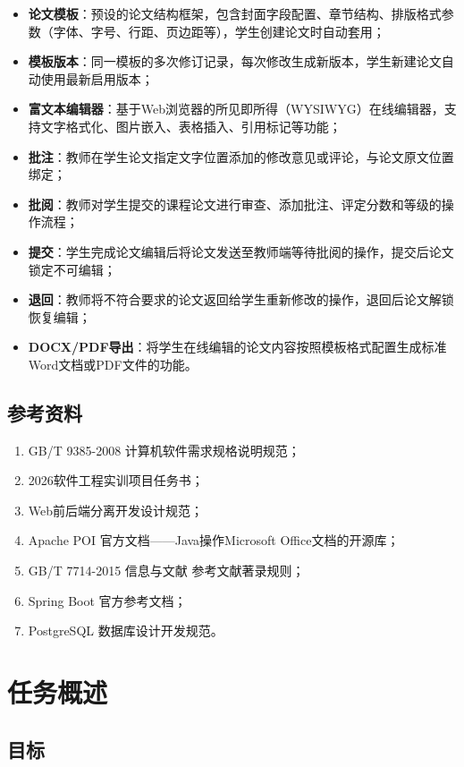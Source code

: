 \begin{itemize}
    \item \textbf{论文模板}：预设的论文结构框架，包含封面字段配置、章节结构、排版格式参数（字体、字号、行距、页边距等），学生创建论文时自动套用；
    \item \textbf{模板版本}：同一模板的多次修订记录，每次修改生成新版本，学生新建论文自动使用最新启用版本；
    \item \textbf{富文本编辑器}：基于Web浏览器的所见即所得（WYSIWYG）在线编辑器，支持文字格式化、图片嵌入、表格插入、引用标记等功能；
    \item \textbf{批注}：教师在学生论文指定文字位置添加的修改意见或评论，与论文原文位置绑定；
    \item \textbf{批阅}：教师对学生提交的课程论文进行审查、添加批注、评定分数和等级的操作流程；
    \item \textbf{提交}：学生完成论文编辑后将论文发送至教师端等待批阅的操作，提交后论文锁定不可编辑；
    \item \textbf{退回}：教师将不符合要求的论文返回给学生重新修改的操作，退回后论文解锁恢复编辑；
    \item \textbf{DOCX/PDF导出}：将学生在线编辑的论文内容按照模板格式配置生成标准Word文档或PDF文件的功能。
\end{itemize}

\subsection{参考资料}

\begin{enumerate}
    \item GB/T 9385-2008 计算机软件需求规格说明规范；
    \item 2026软件工程实训项目任务书；
    \item Web前后端分离开发设计规范；
    \item Apache POI 官方文档——Java操作Microsoft Office文档的开源库；
    \item GB/T 7714-2015 信息与文献 参考文献著录规则；
    \item Spring Boot 官方参考文档；
    \item PostgreSQL 数据库设计开发规范。
\end{enumerate}

\section{任务概述}

\subsection{目标}

